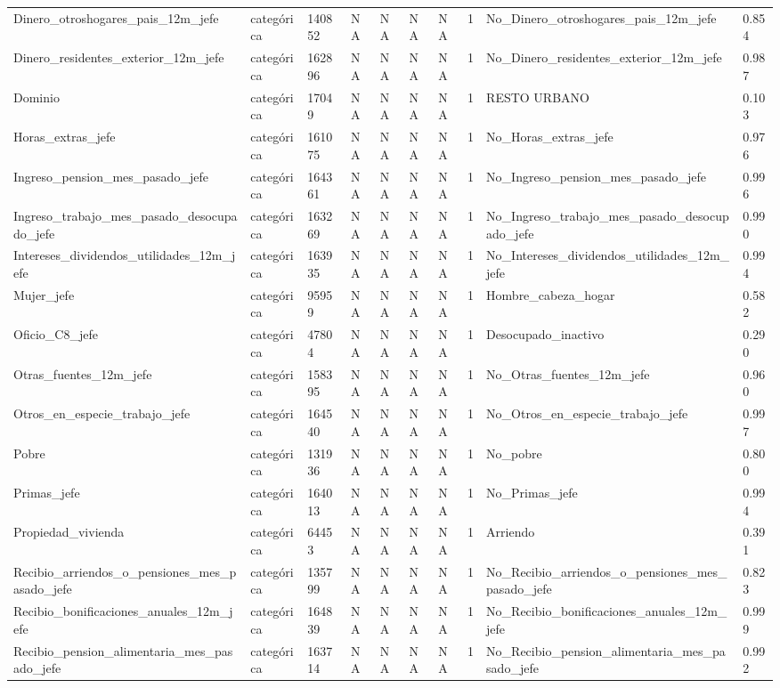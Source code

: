 \begin{longtable}[t]{llllllllll}
Dinero\_otroshogares\_pais\_12m\_jefe & categórica & 140852 & NA & NA & NA & NA & 1 & No\_Dinero\_otroshogares\_pais\_12m\_jefe & 0.854\\
Dinero\_residentes\_exterior\_12m\_jefe & categórica & 162896 & NA & NA & NA & NA & 1 & No\_Dinero\_residentes\_exterior\_12m\_jefe & 0.987\\
Dominio & categórica & 17049 & NA & NA & NA & NA & 1 & RESTO URBANO & 0.103\\
Horas\_extras\_jefe & categórica & 161075 & NA & NA & NA & NA & 1 & No\_Horas\_extras\_jefe & 0.976\\
Ingreso\_pension\_mes\_pasado\_jefe & categórica & 164361 & NA & NA & NA & NA & 1 & No\_Ingreso\_pension\_mes\_pasado\_jefe & 0.996\\
Ingreso\_trabajo\_mes\_pasado\_desocupado\_jefe & categórica & 163269 & NA & NA & NA & NA & 1 & No\_Ingreso\_trabajo\_mes\_pasado\_desocupado\_jefe & 0.990\\
Intereses\_dividendos\_utilidades\_12m\_jefe & categórica & 163935 & NA & NA & NA & NA & 1 & No\_Intereses\_dividendos\_utilidades\_12m\_jefe & 0.994\\
Mujer\_jefe & categórica & 95959 & NA & NA & NA & NA & 1 & Hombre\_cabeza\_hogar & 0.582\\
Oficio\_C8\_jefe & categórica & 47804 & NA & NA & NA & NA & 1 & Desocupado\_inactivo & 0.290\\
Otras\_fuentes\_12m\_jefe & categórica & 158395 & NA & NA & NA & NA & 1 & No\_Otras\_fuentes\_12m\_jefe & 0.960\\
Otros\_en\_especie\_trabajo\_jefe & categórica & 164540 & NA & NA & NA & NA & 1 & No\_Otros\_en\_especie\_trabajo\_jefe & 0.997\\
Pobre & categórica & 131936 & NA & NA & NA & NA & 1 & No\_pobre & 0.800\\
Primas\_jefe & categórica & 164013 & NA & NA & NA & NA & 1 & No\_Primas\_jefe & 0.994\\
Propiedad\_vivienda & categórica & 64453 & NA & NA & NA & NA & 1 & Arriendo & 0.391\\
Recibio\_arriendos\_o\_pensiones\_mes\_pasado\_jefe & categórica & 135799 & NA & NA & NA & NA & 1 & No\_Recibio\_arriendos\_o\_pensiones\_mes\_pasado\_jefe & 0.823\\
Recibio\_bonificaciones\_anuales\_12m\_jefe & categórica & 164839 & NA & NA & NA & NA & 1 & No\_Recibio\_bonificaciones\_anuales\_12m\_jefe & 0.999\\
Recibio\_pension\_alimentaria\_mes\_pasado\_jefe & categórica & 163714 & NA & NA & NA & NA & 1 & No\_Recibio\_pension\_alimentaria\_mes\_pasado\_jefe & 0.992\\

\end{longtable}
